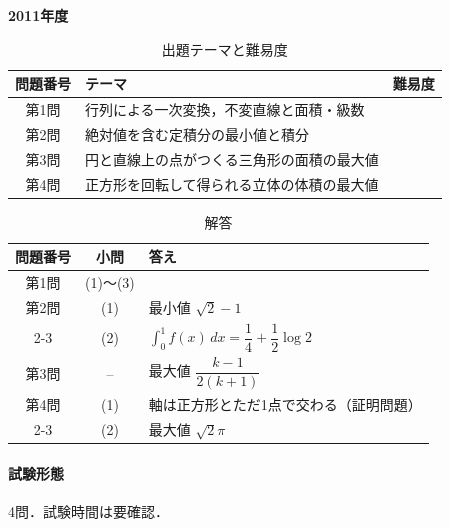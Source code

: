 \documentclass[../../main.tex]{subfiles}
\begin{document}
\begin{center}
  {\fontsize{48pt}{58pt}\selectfont \textbf{2011}\normalsize\textbf{年度}}
\end{center}

\begin{table}[htb]
  \centering
  \caption{出題テーマと難易度}
  \begin{tabular}{|c|p{9cm}|c|}
    \hline
    \textbf{問題番号} & \textbf{テーマ} & \textbf{難易度} \\
    \hline
    第1問 & 行列による一次変換，不変直線と面積・級数 & \\
    \hline
    第2問 & 絶対値を含む定積分の最小値と積分 & \\
    \hline
    第3問 & 円と直線上の点がつくる三角形の面積の最大値 & \\
    \hline
    第4問 & 正方形を回転して得られる立体の体積の最大値 & \\
    \hline
  \end{tabular}
\end{table}

\begin{table}[htb]
  \centering
  \caption{解答}
  \renewcommand{\arraystretch}{1.4}
  \begin{tabular}{|c|c|p{9cm}|}
    \hline
    \textbf{問題番号} & \textbf{小問} & \textbf{答え} \\
    \hline
    第1問 & (1)〜(3) & \\
    \hline
    第2問 & (1) & 最小値 $\sqrt{2}-1$ \\
    \cline{2-3}
    & (2) & $\displaystyle\int_0^1 f(x)\,dx=\dfrac{1}{4}+\dfrac{1}{2}\log 2$ \\
    \hline
    第3問 & -- & 最大値 $\dfrac{k-1}{2(k+1)}$ \\
    \hline
    第4問 & (1) & 軸は正方形とただ1点で交わる（証明問題） \\
    \cline{2-3}
    & (2) & 最大値 $\sqrt{2}\pi$ \\
    \hline
  \end{tabular}
\end{table}

\paragraph{試験形態}
4問．試験時間は要確認．
\end{document}
